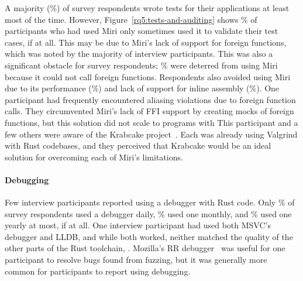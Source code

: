 A majority (\tested\%) of survey respondents wrote tests for their \unsafe applications at least most of the time. However, Figure~\ref{rq5:tests-and-auditing} shows \miritested\% of participants who had used Miri only sometimes used it to validate their test cases, if at all. This may be due to Miri's lack of support for foreign functions, which was noted by the majority of interview participants. This was also a significant obstacle for survey respondents; \% were deterred from using Miri because it could not call foreign functions. Respondents also avoided using Miri due to its performance (\%) and lack of support for inline assembly (\%). 
One participant had frequently encountered aliasing violations due to foreign function calls. They circumvented Miri's lack of FFI support by creating mocks of foreign functions, but this solution did not scale to programs with  This participant and a few others were aware of the Krabcake project~\cite{krabcake}. Each was already using Valgrind with Rust codebases, and they perceived that Krabcake would be an ideal solution for overcoming each of Miri's limitations.



\paragraph{Debugging} Few interview participants reported using a debugger with Rust code. Only \debuggeddaily\% of survey respondents used a debugger daily, \debuggedmonthly\% used one monthly, and \debuggedyearly\% used one yearly at most, if at all. One interview participant had used both MSVC's debugger and LLDB, and while both worked, neither matched the quality of the other parts of the Rust toolchain, . Mozilla's RR debugger~\cite{rr_debugger} was useful for one participant to resolve bugs found from fuzzing, but it was generally more common for participants to report using  debugging.

